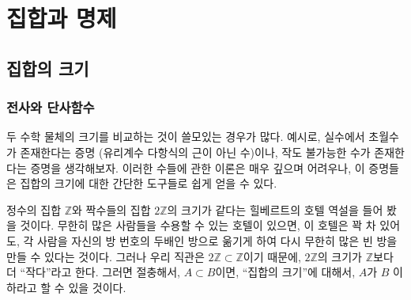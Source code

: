 \part{집합과 명제}

\chapter{집합의 크기}
\label{sec:card}
\section{전사와 단사함수}
두 수학 물체의 크기를 비교하는 것이 쓸모있는 경우가 많다.
예시로, 실수에서 초월수가 존재한다는 증명 (유리계수 다항식의 근이 아닌 수)이나, 작도 불가능한 수가 존재한다는 증명을 생각해보자.
이러한 수들에 관한 이론은 매우 깊으며 어려우나, 이 증명들은 집합의 크기에 대한 간단한 도구들로 쉽게 얻을 수 있다.

정수의 집합 $\mathbb{Z}$와 짝수들의 집합 $2\mathbb{Z}$의 크기가 같다는 힐베르트의 호텔 역설을 들어 봤을 것이다.
무한히 많은 사람들을 수용할 수 있는 호텔이 있으면, 이 호텔은 꽉 차 있어도, 각 사람을 자신의 방 번호의 두배인 방으로 욺기게 하여 다시 무한히 많은 빈 방을 만들 수 있다는 것이다.
그러나 우리 직관은 $2\mathbb{Z} \subset \mathbb{Z}$이기 때문에, $2\mathbb{Z}$의 크기가 $\mathbb{Z}$보다 더 ``작다''라고 한다.
그러면 절충해서, $A \subset B$이면, ``집합의 크기''에 대해서, $A$가 $B$ 이하라고 할 수 있을 것이다.

